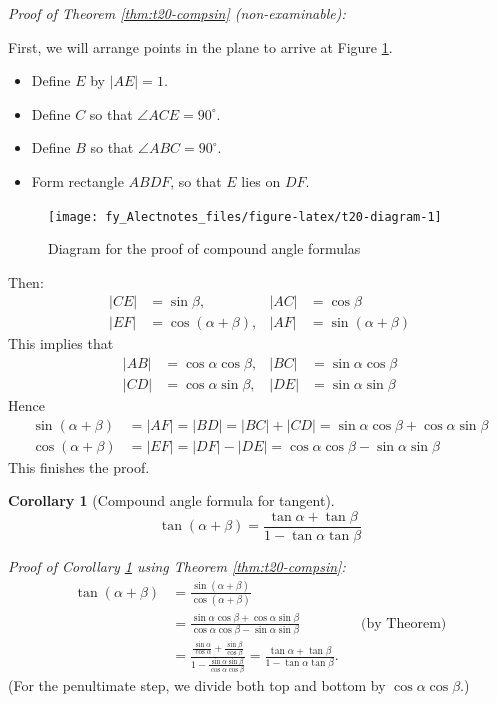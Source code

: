 \documentclass[
  12pt,
  oneside]{book}
\providecommand{\tightlist}{%
  \setlength{\itemsep}{0pt}\setlength{\parskip}{0pt}}
\newtheorem{corollary}{Corollary}[chapter]
\theoremstyle{definition}
\theoremstyle{definition}
\theoremstyle{definition}
\theoremstyle{definition}
\theoremstyle{remark}
\begin{document}
\emph{Proof of Theorem \ref{thm:t20-compsin} (non-examinable):}

First, we will arrange points in the plane to arrive at Figure \ref{fig:t20-diagram}.

\begin{itemize}
\tightlist
\item
  Define \(E\) by \(|AE|=1\).
\item
  Define \(C\) so that \(\angle ACE=90^\circ\).
\item
  Define \(B\) so that \(\angle ABC=90^\circ\).
\item
  Form rectangle \(ABDF\), so that \(E\) lies on \(DF\).
\end{itemize}

\begin{figure}

{\centering \texttt{[image: fy\_Alectnotes\_files/figure-latex/t20-diagram-1]} 

}

\caption{Diagram for the proof of compound angle formulas}\label{fig:t20-diagram}
\end{figure}

Then:
\begin{align}
|CE| &= \sin\beta, & |AC| &= \cos\beta \tag{\(\triangle ACE\)}\\
|EF| &= \cos(\alpha+\beta), & |AF| &=\sin(\alpha+\beta) \tag{\(\triangle AEF\)}
\end{align}
This implies that
\begin{align}
|AB| &= \cos\alpha\cos\beta, & |BC| &= \sin\alpha\cos\beta \tag{\(\triangle ABC\)}\\
|CD| &= \cos\alpha\sin\beta, & |DE| &= \sin\alpha\sin\beta \tag{\(\triangle CDE\)}
\end{align}
Hence
\begin{align*}
\sin(\alpha+\beta) &= |AF| = |BD| = |BC|+|CD| = \sin\alpha\cos\beta+\cos\alpha\sin\beta\\
\cos(\alpha+\beta) &= |EF| = |DF| - |DE| = \cos\alpha\cos\beta - \sin\alpha\sin\beta
\end{align*}
This finishes the proof.

\begin{corollary}[Compound angle formula for tangent]
\protect\hypertarget{cor:t20-comptan}{}\label{cor:t20-comptan}\[\boxed{
  \tan(\alpha+\beta) = \frac{\tan\alpha+\tan\beta}{1-\tan\alpha\tan\beta}
}\]
\end{corollary}

\emph{Proof of Corollary \ref{cor:t20-comptan} using Theorem \ref{thm:t20-compsin}:}
\begin{align*}
\tan(\alpha+\beta) &= \frac{\sin(\alpha+\beta)}{\cos(\alpha+\beta)}\\
 &= \frac{\sin\alpha\cos\beta + \cos\alpha\sin\beta}{\cos\alpha\cos\beta - \sin\alpha\sin\beta} &&\text{(by Theorem)}\\
 &= \frac{\frac{\sin\alpha}{\cos\alpha} + \frac{\sin\beta}{\cos\beta}}{1-\frac{\sin\alpha\sin\beta}{\cos\alpha\cos\beta}}
 = \frac{\tan\alpha+\tan\beta}{1-\tan\alpha\tan\beta}.
\end{align*}
(For the penultimate step, we divide both top and bottom by \(\cos\alpha\cos\beta\).)
\end{document}
